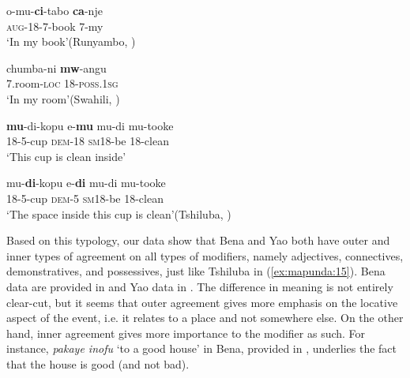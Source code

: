 \documentclass[output=paper ]{langscibook}
\begin{document}
\ea 
\label{ex:mapunda:13}
\gll o-mu-\textbf{ci}{}-tabo     \textbf{ca}{}-nje \\
    \textsc{aug}{}-18-7-book     7-my \\
\glt      ‘In my book’\hfill (Runyambo, \citealt[6]{Rugemalira2004})


\ex 
\label{ex:mapunda:14}
\gll chumba-ni  \textbf{mw}{}-angu \\
 7.room-\textsc{loc}  18-\textsc{poss.1sg}\\
\glt      ‘In my room’\hfill (Swahili, \citealt[154]{Mkude2005})


\ex 
\label{ex:mapunda:15}
    \ea\label{ex:mapunda:15a} \gll   \textbf{mu}{}-di-kopu  e-\textbf{mu}     mu-di     mu-tooke \\
              18-5-cup   \textsc{dem}{}-18  \textsc{sm18}{}-be  18-clean\\
     \glt ‘This cup is clean inside’

    \ex\label{ex:mapunda:15b} \gll mu-\textbf{di}{}-kopu  e-\textbf{di}    mu-di     mu-tooke  \\
          18-5-cup   \textsc{dem}{}-5     \textsc{sm18}{}-be  18-clean\\
     \glt ‘The space inside this cup is clean’\hfill (Tshiluba, \citealt[180]{Stucky1976})
    \z
\z

Based on this typology, our data show that Bena and Yao both have outer and inner types of agreement on all types of modifiers, namely adjectives, connectives, demonstratives, and possessives, just like Tshiluba in (\ref{ex:mapunda:15}). Bena data are provided in  and Yao data in . The difference in meaning is not entirely clear-cut, but it seems that outer agreement gives more emphasis on the locative aspect of the event, i.e. it relates to a place and not somewhere else. On the other hand, inner agreement gives more importance to the modifier as such. For instance, \textit{pakaye inofu} ‘to a good house’ in Bena, provided in , underlies the fact that the house is good (and not bad).  
\end{document}
